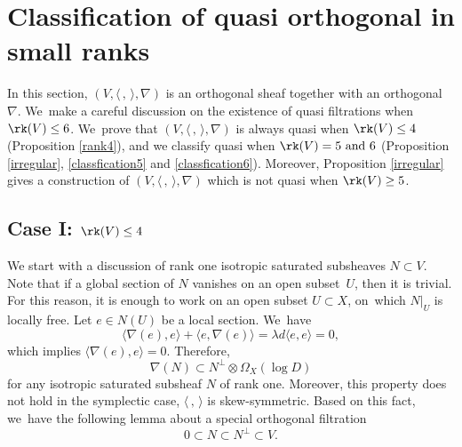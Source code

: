 \section{Classification of quasi \texorpdfstring{\protect\grsemistable}{grsemistable} orthogonal \texorpdfstring{\protect\lconnections}{lconnections} in small ranks}\label{sect_small_rank}

In this section, $(V, \langle \,, \, \rangle, \nabla)$ is an orthogonal sheaf together with an orthogonal \lconnection $\nabla$. We~make a careful discussion on the existence of quasi \grsemistable filtrations when $\rk (V) \leq 6$. We~prove that $(V, \langle \,, \, \rangle, \nabla)$ is always quasi \grsemistable when $\rk(V) \leq 4$ (Proposition \ref{rank4}), and we classify quasi \grsemistable \lconnections when $\rk(V) = 5 \text{ and }6$ (Proposition \ref{irregular}, \ref{classfication5} and \ref{classfication6}). Moreover, Proposition \ref{irregular} gives a construction of $(V, \langle \,, \, \rangle, \nabla)$ which is not quasi \grsemistable when $\rk(V) \geq 5$.

\subsection{Case I: ${\rk(V) \leq 4}$}
We start with a discussion of rank one isotropic saturated subsheaves $N\subset V$. Note that if a global section of $N$ vanishes on an open subset~$U$, then it is trivial. For this reason, it is enough to work on an open subset $U \subset X$, on~which $N|_U$ is locally free. Let $e \in N(U)$ be a local section. We~have
\[
\langle \nabla(e),e \rangle+\langle e,\nabla(e) \rangle=\lambda d\langle e,e \rangle=0,
\]
which implies $\langle \nabla(e),e \rangle=0$. Therefore,
\[
\nabla(N)\subset N^\perp\otimes\Omega_X(\log D)
\]
for any isotropic saturated subsheaf $N$ of rank one. Moreover, this property does not hold in the symplectic case, \ie $\langle \,, \, \rangle$ is skew-symmetric. Based on this fact, we~have the following lemma about a special orthogonal filtration
\[
0\subset N\subset N^\perp\subset V.
\] 

